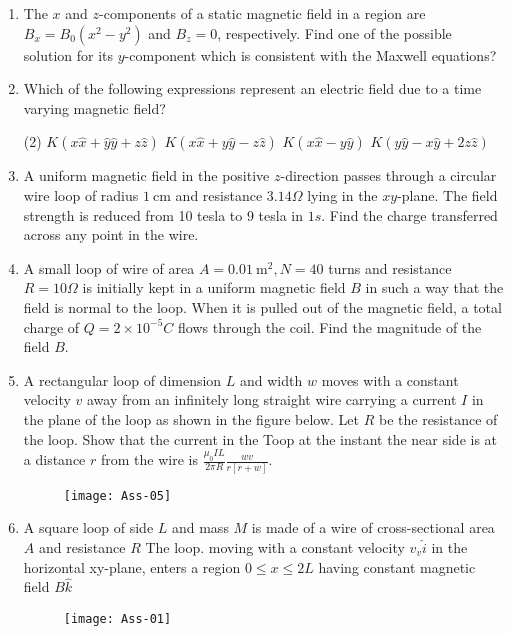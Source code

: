 \begin{enumerate}
	\item 	The $x$ and $z$-components of a static magnetic field in a region are $B_{x}=B_{0}\left(x^{2}-y^{2}\right)$ and $B_{z}=0$, respectively. Find one of the possible solution for its $y$-component which is consistent with the Maxwell equations?
	\item 	Which of the following expressions represent an electric field due to a time varying magnetic field?
	\begin{tasks}(2)
		\task[\textbf{a.}]$K(x \hat{x}+\hat{y} \hat{y}+z \hat{z})$
		\task[\textbf{b.}]$K(x \hat{x}+y \hat{y}-z \hat{z})$
		\task[\textbf{c.}] $K(x \hat{x}-y \hat{y})$
		\task[\textbf{d.}] $K(y \hat{y}-x \hat{y}+2 z \hat{z})$
	\end{tasks}
	\item A uniform magnetic field in the positive $z$-direction passes through a circular wire loop of radius $1 \mathrm{~cm}$ and resistance $3.14 \Omega$ lying in the $x y$-plane. The field strength is reduced from 10 tesla to 9 tesla in $1 s$. Find the charge transferred across any point in the wire. 
	\item A small loop of wire of area $A=0.01 \mathrm{~m}^{2}, N=40$ turns and resistance $R=10 \Omega$ is initially kept in a uniform magnetic field $B$ in such a way that the field is normal to the loop. When it is pulled out of the magnetic field, a total charge of $Q=2 \times 10^{-5} C$ flows through the coil. Find the magnitude of the field $B$.
	\item A rectangular loop of dimension $L$ and width $w$ moves with a constant velocity $v$ away from an infinitely long straight wire carrying a current $I$ in the plane of the loop as shown in the figure below. Let $R$ be the resistance of the loop. Show that the current in the Toop at the instant the near side is at a distance $r$ from the wire is $\frac{\mu_{0} I L}{2 \pi R} \frac{w v}{r[r+w]}$.
	\begin{figure}[H]
		\centering
		\texttt{[image: Ass-05]}
	\end{figure}
	\item A square loop of side $L$ and mass $M$ is made of a wire of cross-sectional area $A$ and resistance $R$ The loop. moving with a constant velocity $v_{v} \hat{i}$ in the horizontal xy-plane, enters a region $0 \leq x \leq 2 L$ having constant magnetic field $B \hat{k}$
	\begin{figure}[H]
		\centering
		\texttt{[image: Ass-01]}

\end{figure}
\end{enumerate}
